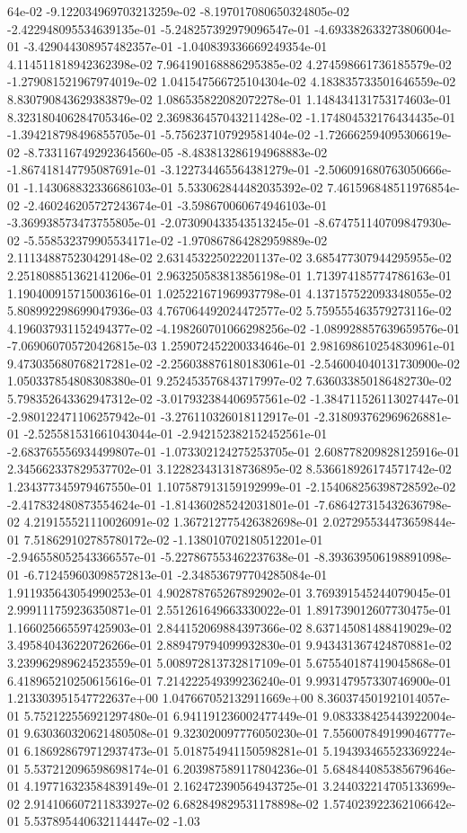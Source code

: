 64e-02	-9.122034969703213259e-02	-8.197017080650324805e-02	-2.422948095534639135e-01	-5.248257392979096547e-01	-4.693382633273806004e-01	-3.429044308957482357e-01	-1.040839336669249354e-01	4.114511818942362398e-02	7.964190168886295385e-02	4.274598661736185579e-02	-1.279081521967974019e-02	1.041547566725104304e-02	4.183835733501646559e-02	8.830790843629383879e-02	1.086535822082072278e-01	1.148434131753174603e-01	8.323180406284705346e-02	2.369836457043211428e-02	-1.174804532176434435e-01	-1.394218798496855705e-01	-5.756237107929581404e-02	-1.726662594095306619e-02	-8.733116749292364560e-05	-8.483813286194968883e-02	-1.867418147795087691e-01	-3.122734465564381279e-01	-2.506091680763050666e-01	-1.143068832336686103e-01	5.533062844482035392e-02	7.461596848511976854e-02	-2.460246205727243674e-01	-3.598670060674946103e-01	-3.369938573473755805e-01	-2.073090433543513245e-01	-8.674751140709847930e-02	-5.558532379905534171e-02	-1.970867864282959889e-02	2.111348875230429148e-02	2.631453225022201137e-02	3.685477307944295955e-02	2.251808851362141206e-01	2.963250583813856198e-01	1.713974185774786163e-01	1.190400915715003616e-01	1.025221671969937798e-01	4.137157522093348055e-02	5.808992298699047936e-03	4.767064492024472577e-02	5.759555463579273116e-02	4.196037931152494377e-02	-4.198260701066298256e-02	-1.089928857639659576e-01	-7.069060705720426815e-03	1.259072452200334646e-01	2.981698610254830961e-01	9.473035680768217281e-02	-2.256038876180183061e-01	-2.546004040131730900e-02	1.050337854808308380e-01	9.252453576843717997e-02	7.636033850186482730e-02	5.798352643362947312e-02	-3.017932384406957561e-02	-1.384711526113027447e-01	-2.980122471106257942e-01	-3.276110326018112917e-01	-2.318093762969626881e-01	-2.525581531661043044e-01	-2.942152382152452561e-01	-2.683765556934499807e-01	-1.073302124275253705e-01	2.608778209828125916e-01	2.345662337829537702e-01	3.122823431318736895e-02	8.536618926174571742e-02	1.234377345979467550e-01	1.107587913159192999e-01	-2.154068256398728592e-02	-2.417832480873554624e-01	-1.814360285242031801e-01	-7.686427315432636798e-02	4.219155521110026091e-02	1.367212775426382698e-01	2.027295534473659844e-01	7.518629102785780172e-02	-1.138010702180512201e-01	-2.946558052543366557e-01	-5.227867553462237638e-01	-8.393639506198891098e-01	-6.712459603098572813e-01	-2.348536797704285084e-01	1.911935643054990253e-01	4.902878765267892902e-01	3.769391545244079045e-01	2.999111759236350871e-01	2.551261649663330022e-01	1.891739012607730475e-01	1.166025665597425903e-01	2.844152069884397366e-02	8.637145081488419029e-02	3.495840436220726266e-01	2.889479794099932830e-01	9.943431367424870881e-02	3.239962989624523559e-01	5.008972813732817109e-01	5.675540187419045868e-01	6.418965210250615616e-01	7.214222549399236240e-01	9.993147957330746900e-01	1.213303951547722637e+00	1.047667052132911669e+00	8.360374501921014057e-01	5.752122556921297480e-01	6.941191236002477449e-01	9.083338425443922004e-01	9.630360320621480508e-01	9.323020097776050230e-01	7.556007849199046777e-01	6.186928679712937473e-01	5.018754941150598281e-01	5.194393465523369224e-01	5.537212096598698174e-01	6.203987589117804236e-01	5.684844085385679646e-01	4.197716323584839149e-01	2.162472390564943725e-01	3.244032214705133699e-02	2.914106607211833927e-02	6.682849829531178898e-02	1.574023922362106642e-01	5.537895440632114447e-02	-1.03